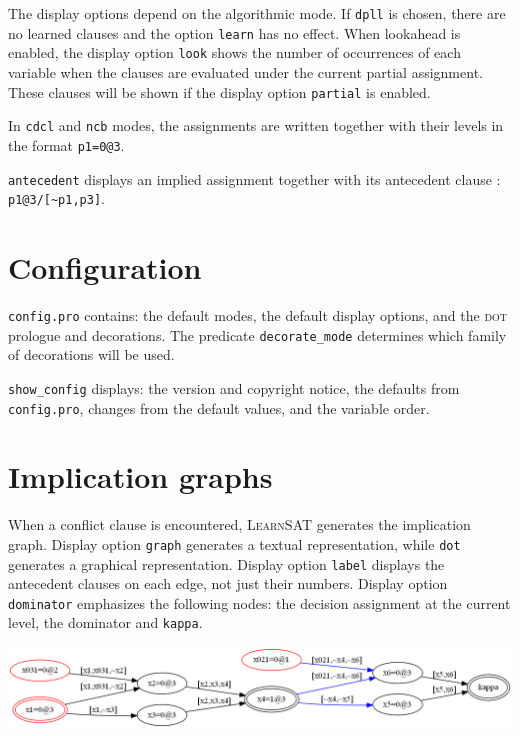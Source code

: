 \documentclass[11pt]{article}
\newcommand*{\p}[1]{\textup{\texttt{#1}}}
\newcommand*{\ls}{\textsc{LearnSAT}}
\newcommand*{\dt}{\textsc{dot}}
\begin{document}
The display options depend on the algorithmic mode. If \p{dpll} is chosen, there are no learned clauses and the option \p{learn} has no effect. When lookahead is enabled, the display option \p{look} shows the number of occurrences of each variable when the clauses are evaluated under the current partial assignment. These clauses will be shown if the display option \p{partial} is enabled.

In \p{cdcl} and \p{ncb} modes, the assignments are written together with their levels in the format \p{p1=0@3}.

\p{antecedent} displays an implied assignment together with its
antecedent clause : \verb+p1@3/[~p1,p3]+.


\section{Configuration}

\p{config.pro} contains: the default modes, the default display options, and the \dt{} prologue and decorations. The predicate \p{decorate\_mode} determines which family of decorations will be used.

\p{show\_config} displays: the version and copyright notice, the
defaults from \p{config.pro}, changes from the default values, and the
variable order.


\section{Implication graphs}\label{s.impl}

When a conflict clause is encountered, \ls{} generates the implication
graph. Display option \p{graph} generates a textual representation,
while \p{dot} generates a graphical representation. Display option
\p{label} displays the antecedent clauses on each edge, not just their
numbers. Display option \p{dominator} emphasizes the following nodes:
the decision assignment at the current level, the dominator and
\p{kappa}.

\begin{center}
\includegraphics[keepaspectratio=true,width=\textwidth]{dom-color}
\end{center}
\end{document}
